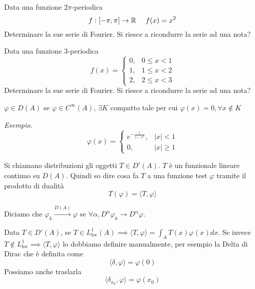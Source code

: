 Data una funzione $2\pi $-periodica
\begin{equation*}
f:[ -\pi ,\pi ]\rightarrow \RR  \ \ \ \ f(x)=x^{2}
\end{equation*}
Determinare la sue serie di Fourier. Si riesce a ricondurre la serie ad una nota?
\Esercizio{}

Data una funzione $3$-periodica
\begin{equation*}
f(x)=\begin{cases}
0, & 0\leq x< 1\\
1, & 1\leq x< 2\\
2, & 2\leq x< 3
\end{cases}
\end{equation*}
Determinare la sue serie di Fourier. Si riesce a ricondurre la serie ad una nota?
\Esercizio{}
\begin{defn}
 $\varphi \in D( A)$ se $\varphi \in C^{\infty }( A)$, $\exists K$ compatto tale per cui $\varphi ( x) =0,\forall x\notin K$
\end{defn}
\textit{Esempio.}
\begin{equation*}
\varphi ( x) =\begin{cases}
e^{-\frac{1}{1-x^{2}}} , & | x| < 1\\
0, & | x| \geqslant 1
\end{cases}
\end{equation*}
\begin{defn}
[Distribuzione] Si chiamano distribuzioni gli oggetti $T\in D'( A)$. $T$ è un funzionale lineare continuo su $D( A)$. Quindi so dire cosa fa $T$ a una funzione test $\varphi $ tramite il prodotto di dualità
\begin{equation*}
T( \varphi ) =\langle T,\varphi \rangle 
\end{equation*}
\end{defn}
\begin{defn}
 Diciamo che $\varphi _{k}\xrightarrow{D( A)} \varphi $ se $\forall \alpha ,D^{\alpha } \varphi _{k}\rightarrow D^{\alpha } \varphi $.
\end{defn}
\begin{defn}
 Data $T\in D'( A)$, se $T\in L^{1}_{\mathrm{loc}}( A) \implies \langle T,\varphi \rangle =\int _{A} T( x) \varphi ( x) dx$. Se invece $T\notin L^{1}_{\mathrm{loc}} \implies \langle T,\varphi \rangle $ lo dobbiamo definire manualmente, per esempio la Delta di Dirac che è definita come
\begin{equation*}
\langle \delta ,\varphi \rangle =\varphi ( 0)
\end{equation*}
Possiamo anche traslarla
\begin{equation*}
\langle \delta _{x_{0}} ,\varphi \rangle =\varphi ( x_{0})
\end{equation*}
\end{defn}
